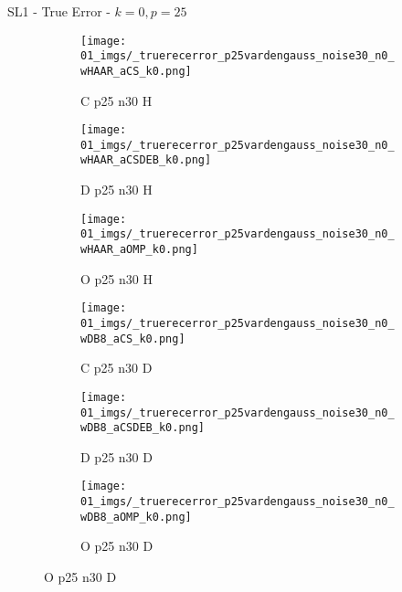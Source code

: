 \begin{frame}{SL1 - True Error - $k=0,p=25$}{}
\begin{figure}
\vspace{5pt}

\begin{subfigure}{0.13\textwidth}
\texttt{[image: 01\_imgs/\_truerecerror\_p25vardengauss\_noise30\_n0\_wHAAR\_aCS\_k0.png]}
\caption*{\tiny C p25 n30 H}
\end{subfigure}
\begin{subfigure}{0.13\textwidth}
\texttt{[image: 01\_imgs/\_truerecerror\_p25vardengauss\_noise30\_n0\_wHAAR\_aCSDEB\_k0.png]}
\caption*{\tiny D p25 n30 H}
\end{subfigure}
\begin{subfigure}{0.13\textwidth}
\texttt{[image: 01\_imgs/\_truerecerror\_p25vardengauss\_noise30\_n0\_wHAAR\_aOMP\_k0.png]}
\caption*{\tiny O p25 n30 H}
\end{subfigure}
\begin{subfigure}{0.13\textwidth}
\texttt{[image: 01\_imgs/\_truerecerror\_p25vardengauss\_noise30\_n0\_wDB8\_aCS\_k0.png]}
\caption*{\tiny C p25 n30 D}
\end{subfigure}
\begin{subfigure}{0.13\textwidth}
\texttt{[image: 01\_imgs/\_truerecerror\_p25vardengauss\_noise30\_n0\_wDB8\_aCSDEB\_k0.png]}
\caption*{\tiny D p25 n30 D}
\end{subfigure}
\begin{subfigure}{0.13\textwidth}
\texttt{[image: 01\_imgs/\_truerecerror\_p25vardengauss\_noise30\_n0\_wDB8\_aOMP\_k0.png]}
\caption*{\tiny O p25 n30 D}
\end{subfigure}
\end{figure}
\end{frame}

